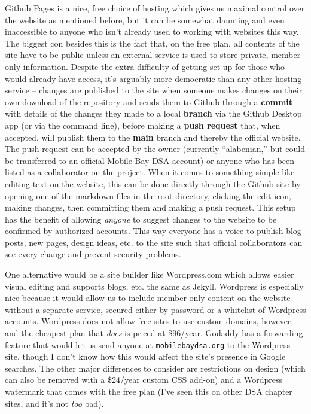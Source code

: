 \documentclass[
]{book}
\begin{document}
Github Pages is a nice, free choice of hosting which gives us maximal control over the website as mentioned before, but it can be somewhat daunting and even inaccessible to anyone who isn't already used to working with websites this way. The biggest con besides this is the fact that, on the free plan, all contents of the site have to be public unless an external service is used to store private, member-only information. Despite the extra difficulty of getting set up for those who would already have access, it's arguably more democratic than any other hosting service -- changes are published to the site when someone makes changes on their own download of the repository and sends them to Github through a \textbf{commit} with details of the changes they made to a local \textbf{branch} via the Github Desktop app (or via the command line), before making a \textbf{push request} that, when accepted, will publish them to the \textbf{main} branch and thereby the official website. The push request can be accepted by the owner (currently ``alabenian,'' but could be transferred to an official Mobile Bay DSA account) or anyone who has been listed as a collaborator on the project. When it comes to something simple like editing text on the website, this can be done directly through the Github site by opening one of the markdown files in the root directory, clicking the edit icon, making changes, then committing them and making a push request. This setup has the benefit of allowing \emph{anyone} to suggest changes to the website to be confirmed by authorized accounts. This way everyone has a voice to publish blog posts, new pages, design ideas, etc. to the site such that official collaborators can see every change and prevent security problems.

One alternative would be a site builder like Wordpress.com which allows easier visual editing and supports blogs, etc. the same as Jekyll. Wordpress is especially nice because it would allow us to include member-only content on the website without a separate service, secured either by password or a whitelist of Wordpress accounts. Wordpress does not allow free sites to use custom domains, however, and the cheapest plan that \emph{does} is priced at \$96/year. Godaddy has a forwarding feature that would let us send anyone at \texttt{mobilebaydsa.org} to the Wordpress site, though I don't know how this would affect the site's presence in Google searches. The other major differences to consider are restrictions on design (which can also be removed with a \$24/year custom CSS add-on) and a Wordpress watermark that comes with the free plan (I've seen this on other DSA chapter sites, and it's not \emph{too} bad).
\end{document}
